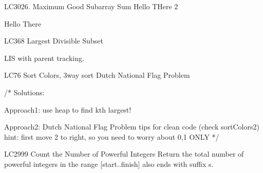\begin{problem}{LC3026. Maximum Good Subarray Sum}
    Hello THere 2
\end{problem}

\begin{solution}

    \begin{code3}
        Hello There
    \end{code3}
\end{solution}

\begin{problem}{LC368 Largest Divisible Subset}
\end{problem}

\begin{solution}[Pure LIS (=ending at idx)]

    LIS with parent tracking.
\end{solution}

\begin{problem}{LC76 Sort Colors, 3way sort}
    Dutch National Flag Problem
\end{problem}

\begin{solution}[hints]
    \begin{code2}
    /* Solutions:

    Approach1: use heap to find kth largest!

    Approach2: Dutch National Flag Problem
        tips for clean code (check sortColors2)
        hint: first move 2 to right, so you need to worry about 0,1 ONLY
    */
    \end{code2}
\end{solution}


\begin{problem}{LC2999 Count the Number of Powerful Integers}
    Return the total number of powerful integers in the range [start..finish] also ends with suffix s.
\end{problem}


